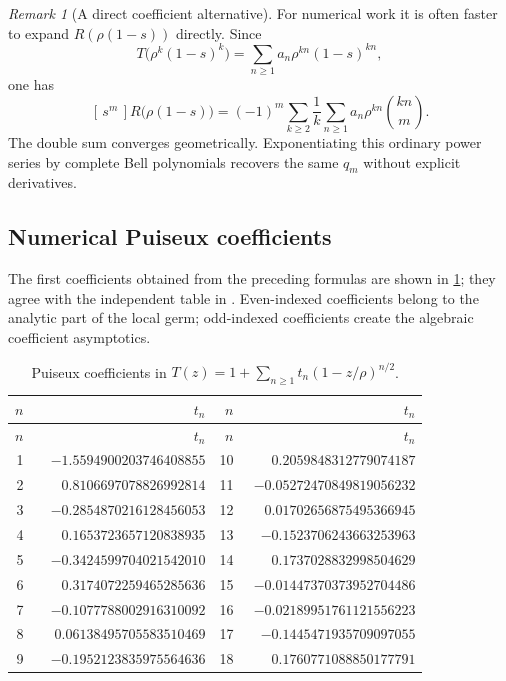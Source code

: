 \documentclass[11pt,oneside]{article}
\numberwithin{equation}{section}
\theoremstyle{plain}
\theoremstyle{definition}
\theoremstyle{remark}
\newtheorem{remark}[theorem]{Remark}
\newcommand{\Coeff}[2]{[\,#1^{#2}\,]}
\begin{document}
\begin{remark}[A direct coefficient alternative]
For numerical work it is often faster to expand $R(\rho(1-s))$ directly.
Since
\[
 T\bigl(\rho^k(1-s)^k\bigr)
 =\sum_{n\ge1}a_n\rho^{kn}(1-s)^{kn},
\]
one has
\begin{equation}\label{eq:R-direct-coeff}
 \Coeff{s}{m}R\bigl(\rho(1-s)\bigr)
 =(-1)^m\sum_{k\ge2}\frac1k\sum_{n\ge1}
 a_n\rho^{kn}\binom{kn}{m}.
\end{equation}
The double sum converges geometrically.  Exponentiating this ordinary power
series by complete Bell polynomials recovers the same $q_m$ without explicit
derivatives.
\end{remark}

\subsection{Numerical Puiseux coefficients}

The first coefficients obtained from the preceding formulas are shown in
\cref{tab:t-coefficients}; they agree with the independent table in
\cite{Genitrini2016}.  Even-indexed coefficients belong to the analytic
part of the local germ; odd-indexed coefficients create the algebraic
coefficient asymptotics.

\begin{longtable}{@{}r@{\quad}r@{\qquad}r@{\quad}r@{}}
\caption{Puiseux coefficients in
$T(z)=1+\sum_{n\ge1}t_n(1-z/\rho)^{n/2}$.}
\label{tab:t-coefficients}\\
\toprule
$n$ & $t_n$ & $n$ & $t_n$\\
\midrule
\endfirsthead
\toprule
$n$ & $t_n$ & $n$ & $t_n$\\
\midrule
\endhead
1  & $-1.5594900203746408855$ & 10 & $\phantom{-}0.2059848312779074187$\\
2  & $\phantom{-}0.8106697078826992814$ & 11 & $-0.05272470849819056232$\\
3  & $-0.2854870216128456053$ & 12 & $\phantom{-}0.01702656875495366945$\\
4  & $\phantom{-}0.1653723657120838935$ & 13 & $-0.1523706243663253963$\\
5  & $-0.3424599704021542010$ & 14 & $\phantom{-}0.1737028832998504629$\\
6  & $\phantom{-}0.3174072259465285636$ & 15 & $-0.01447370373952704486$\\
7  & $-0.1077788002916310092$ & 16 & $-0.02189951761121556223$\\
8  & $\phantom{-}0.06138495705583510469$ & 17 & $-0.1445471935709097055$\\
9  & $-0.1952123835975564636$ & 18 & $\phantom{-}0.1760771088850177791$\\
\bottomrule
\end{longtable}
\end{document}
